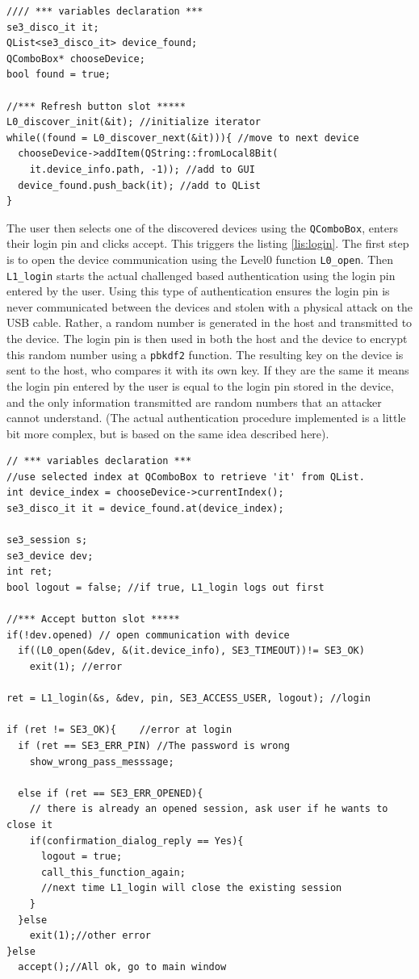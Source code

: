 \begin{lstlisting}[style=customc, float=htb, caption={Connected Devices discovery}, label = {lis:dis}]
//// *** variables declaration ***
se3_disco_it it;
QList<se3_disco_it> device_found;
QComboBox* chooseDevice;
bool found = true;

//*** Refresh button slot *****
L0_discover_init(&it); //initialize iterator
while((found = L0_discover_next(&it))){ //move to next device
  chooseDevice->addItem(QString::fromLocal8Bit(
    it.device_info.path, -1)); //add to GUI
  device_found.push_back(it); //add to QList
}
\end{lstlisting}

The user then selects one of the discovered devices using the \texttt{QComboBox}, enters their login pin and clicks accept. This triggers the listing \ref{lis:login}. The first step is to open the device communication using the Level0 function \texttt{L0\_open}. Then \texttt{L1\_login} starts the actual challenged based authentication using the login pin entered by the user. Using this type of authentication ensures the login pin is never communicated between the devices and stolen with a physical attack on the USB cable. Rather, a random number is generated in the host and transmitted to the device. The login pin is then used in both the host and the device to encrypt this random number using a \texttt{pbkdf2} function. The resulting key on the device is sent to the host, who compares it with its own key. If they are the same it means the login pin entered by the user is equal to the login pin stored in the device, and the only information transmitted are random numbers that an attacker cannot understand. (The actual authentication procedure implemented is a little bit more complex, but is based on the same idea described here).

\begin{lstlisting}[style=customc, float=htb, caption={Open device and try to login}, label = {lis:login}]
// *** variables declaration ***
//use selected index at QComboBox to retrieve 'it' from QList.
int device_index = chooseDevice->currentIndex();
se3_disco_it it = device_found.at(device_index);

se3_session s; 
se3_device dev;
int ret;
bool logout = false; //if true, L1_login logs out first

//*** Accept button slot *****
if(!dev.opened) // open communication with device
  if((L0_open(&dev, &(it.device_info), SE3_TIMEOUT))!= SE3_OK)
    exit(1); //error

ret = L1_login(&s, &dev, pin, SE3_ACCESS_USER, logout); //login

if (ret != SE3_OK){    //error at login
  if (ret == SE3_ERR_PIN) //The password is wrong
    show_wrong_pass_messsage;
    
  else if (ret == SE3_ERR_OPENED){
    // there is already an opened session, ask user if he wants to close it
    if(confirmation_dialog_reply == Yes){ 
      logout = true; 
      call_this_function_again;
      //next time L1_login will close the existing session
    }
  }else            
    exit(1);//other error
}else
  accept();//All ok, go to main window
\end{lstlisting}

